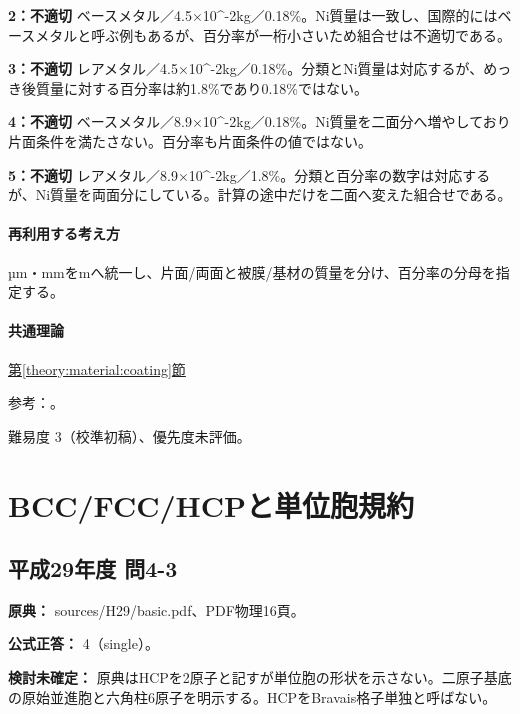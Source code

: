 \noindent\textbf{2：不適切} ベースメタル／4.5×10\textasciicircum{}-2kg／0.18\%。Ni質量は一致し、国際的にはベースメタルと呼ぶ例もあるが、百分率が一桁小さいため組合せは不適切である。\par

\noindent\textbf{3：不適切} レアメタル／4.5×10\textasciicircum{}-2kg／0.18\%。分類とNi質量は対応するが、めっき後質量に対する百分率は約1.8\%であり0.18\%ではない。\par

\noindent\textbf{4：不適切} ベースメタル／8.9×10\textasciicircum{}-2kg／0.18\%。Ni質量を二面分へ増やしており片面条件を満たさない。百分率も片面条件の値ではない。\par

\noindent\textbf{5：不適切} レアメタル／8.9×10\textasciicircum{}-2kg／1.8\%。分類と百分率の数字は対応するが、Ni質量を両面分にしている。計算の途中だけを二面へ変えた組合せである。\par

\paragraph{再利用する考え方} µm・mmをmへ統一し、片面/両面と被膜/基材の質量を分け、百分率の分母を指定する。

\paragraph{共通理論} \hyperref[theory:material:coating]{第\ref*{theory:material:coating}節}

\par 参考：\cite{jogmec_nickel2014}。

\par 難易度 3（校準初稿）、優先度未評価。

\section{BCC/FCC/HCPと単位胞規約}

\subsection{平成29年度 問4-3}
\label{q:h29-reg-basic-4-3}

\noindent\textbf{原典：} sources/H29/basic.pdf、PDF物理16頁。

\textbf{公式正答：} 4（single）。

\par\textbf{検討未確定：} 原典はHCPを2原子と記すが単位胞の形状を示さない。二原子基底の原始並進胞と六角柱6原子を明示する。HCPをBravais格子単独と呼ばない。

